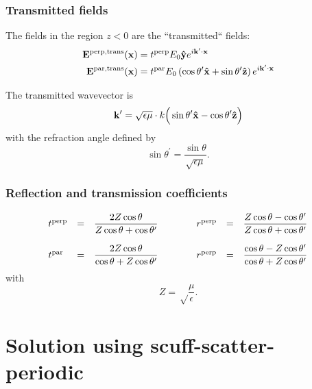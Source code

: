 \documentclass[letterpaper]{article}
\begin{document}
\subsubsection*{Transmitted fields}

The fields in the region $z<0$ are the ``transmitted`` fields:
\begin{subequations}
\begin{align}
 \mathbf{E}^{\hbox{\scriptsize{perp,trans}}}(\mathbf{x})
  &= t^{\hbox{\scriptsize{perp}}}E_0\mathbf{\hat y} e^{i\mathbf{k}^\prime\cdot \mathbf{x}}
\\
 \mathbf{E}^{\hbox{\scriptsize{par,trans}}}(\mathbf{x}) 
  &= t^{\hbox{\scriptsize{par}}} E_0\left(\cos\theta^\prime\mathbf{\hat x} + \sin\theta^\prime\mathbf{\hat z}\right)
  e^{i\mathbf{k}^\prime \cdot \mathbf{x}} 
\end{align}
\label{Etrans}
\end{subequations}

The transmitted wavevector is 
$$ \mathbf{k}^\prime= \sqrt{\epsilon \mu} \cdot k 
   \Big(\sin\theta^\prime\mathbf{\hat x} - \cos\theta^\prime\mathbf{\hat z}\Big)
$$
with the refraction angle defined by 
$$ \sin \theta^\prime = \frac{\sin\theta}{\sqrt{\epsilon\mu}}.$$

\subsubsection*{Reflection and transmission coefficients}

$$\begin{array}{lclclcl}
  t^{\hbox{\scriptsize{perp}}} 
  &=& 
  \displaystyle{\frac{2Z\cos\theta}{Z\cos\theta + \cos\theta^\prime}}
  &\qquad&
  r^{\hbox{\scriptsize{perp}}} 
  &=& 
  \displaystyle{\frac{Z\cos\theta - \cos\theta^\prime}{Z\cos\theta + \cos\theta^\prime}}
\\[15pt]
  t^{\hbox{\scriptsize{par}}} &=& 
  \displaystyle{\frac{2Z\cos\theta}{\cos\theta + Z\cos\theta^\prime}}
  &\qquad&
  r^{\hbox{\scriptsize{perp}}} &=& 
  \displaystyle{\frac{\cos\theta - Z\cos\theta^\prime}{\cos\theta + Z\cos\theta^\prime}}
\end{array}
$$
with
$$ Z=\sqrt\frac{\mu}{\epsilon}.$$

\newpage
\section{Solution using {\sc scuff-scatter-periodic}}
\end{document}
